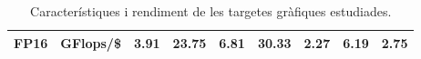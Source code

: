 \begin{table}[H]
\begin{adjustwidth}{-1.5in}{-1.5in}
\begin{center}
{\begin{tabular}{cc||c|c|c|c|c|c|c}
\multirow{-3}{*}{FP16}            & GFlops/\$                                                                              & 3.91                                                            & 23.75                                                            & 6.81                                                                 & 30.33                                                         & 2.27                                                                 & 6.19                                                                   & 2.75 \\ \hline
\end{tabular}
    }
\end{center}
\end{adjustwidth}
    \caption{Característiques i rendiment de les targetes gràfiques estudiades.}
    \label{tab:gpu_specs}
\end{table}

